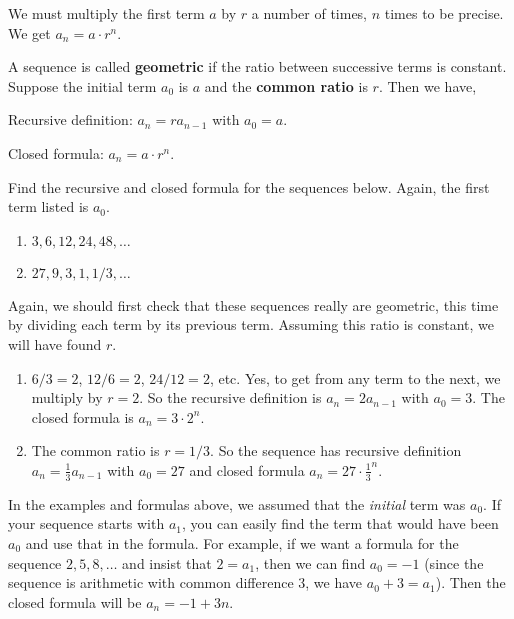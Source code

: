 \documentclass[11pt,]{book}
\newcommand{\terminology}[1]{\textbf{#1}}
\theoremstyle{ptxplainnotitle}
\theoremstyle{ptxplaintitle}
\theoremstyle{ptxdefinitionnotitle}
\theoremstyle{ptxdefinitiontitle}
\theoremstyle{ptxdefinitionnotitle}
\theoremstyle{ptxdefinitiontitle}
\theoremstyle{ptxdefinitionnotitle}
\theoremstyle{ptxdefinitiontitle}
\theoremstyle{ptxdefinitiontitlenonumber}
\theoremstyle{ptxdefinitiontitlenonumber}
\numberwithin{equation}{chapter}
\begin{document}
We must multiply the first term \(a\) by \(r\) a number of times, \(n\) times to be precise. We get \(a_n = a\cdot r^{n}\).%
\begin{assemblage}\label{assemblage-4}
\hypertarget{p-167}{}%
A sequence is called \terminology{geometric} if the ratio between successive terms is constant. Suppose the initial term \(a_0\) is \(a\) and the \terminology{common ratio} is \(r\). Then we have,%
\par
\hypertarget{p-168}{}%
Recursive definition: \(a_n = ra_{n-1}\) with \(a_0 = a\).%
\par
\hypertarget{p-169}{}%
Closed formula: \(a_n = a\cdot r^{n}\).%
\end{assemblage}
\begin{example}\label{example-6}
\hypertarget{p-170}{}%
Find the recursive and closed formula for the sequences below. Again, the first term listed is \(a_0\). \leavevmode%
\begin{enumerate}
\item\hypertarget{li-105}{}\(3, 6, 12, 24, 48, \ldots\)%
\item\hypertarget{li-106}{}\(27, 9, 3, 1, 1/3, \ldots\)%
\end{enumerate}
%
\par\smallskip%
\noindent\textbf{}\hypertarget{solution-17}{}\hypertarget{p-171}{}%
Again, we should first check that these sequences really are geometric, this time by dividing each term by its previous term.  Assuming this ratio is constant, we will have found \(r\). \leavevmode%
\begin{enumerate}
\item\hypertarget{li-107}{}\(6/3 = 2\), \(12/6 = 2\), \(24/12 = 2\), etc. Yes, to get from any term to the next, we multiply by \(r = 2\). So the recursive definition is \(a_n = 2a_{n-1}\) with \(a_0 = 3\). The closed formula is \(a_n = 3\cdot 2^{n}\).%
\item\hypertarget{li-108}{}\hypertarget{p-172}{}%
The common ratio is \(r = 1/3\). So the sequence has recursive definition \(a_n = \frac{1}{3}a_{n-1}\) with \(a_0 = 27\) and closed formula \(a_n = 27\cdot \frac{1}{3}^{n}\).%
\end{enumerate}
%
\end{example}
\hypertarget{p-173}{}%
In the examples and formulas above, we assumed that the \emph{initial} term was \(a_0\). If your sequence starts with \(a_1\), you can easily find the term that would have been \(a_0\) and use that in the formula. For example, if we want a formula for the sequence \(2, 5, 8,\ldots\) and insist that \(2= a_1\), then we can find \(a_0 = -1\) (since the sequence is arithmetic with common difference 3, we have \(a_0 + 3 = a_1\)). Then the closed formula will be \(a_n = -1 + 3n\).%
\end{document}

